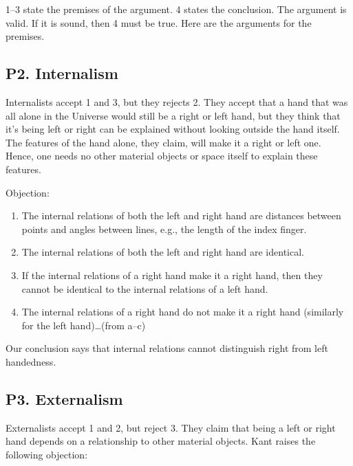 \documentclass[oneside]{article}
\begin{document}
1--3 state the premises of the argument. 4 states the conclusion. The
argument is valid. If it is sound, then 4 must be true. Here are the
arguments for the premises.

\subsection*{P2. Internalism}\label{p2.-internalism}

Internalists accept 1 and 3, but they rejects 2. They accept that a hand
that was all alone in the Universe would still be a right or left hand,
but they think that it's being left or right can be explained without
looking outside the hand itself. The features of the hand alone, they
claim, will make it a right or left one. Hence, one needs no other
material objects or space itself to explain these features.

Objection:

\begin{enumerate}

\item
  The internal relations of both the left and right hand are distances
  between points and angles between lines, e.g., the length of the index
  finger.
\item
  The internal relations of both the left and right hand are identical.
\item
  If the internal relations of a right hand make it a right hand, then
  they cannot be identical to the internal relations of a left hand.\\
\item
  The internal relations of a right hand do not make it a right hand
  (similarly for the left hand)\ldots{}(from a--c)
\end{enumerate}

Our conclusion says that internal relations cannot distinguish right
from left handedness.

\subsection*{P3. Externalism}\label{p3.-externalism}

Externalists accept 1 and 2, but reject 3. They claim that being a left
or right hand depends on a relationship to other material objects. Kant
raises the following objection:
\end{document}
